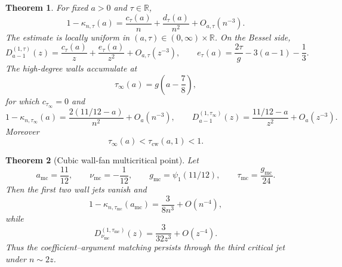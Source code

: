 \documentclass[11pt,a4paper]{amsart}
\numberwithin{equation}{section}
\theoremstyle{plain}
\newtheorem{theorem}{Theorem}[section]
\theoremstyle{definition}
\newcommand{\R}{\mathbb R}
\begin{document}
\begin{theorem}\label{thm:wall-fan}
For fixed \(a>0\) and \(\tau\in\R\),
\begin{equation}\label{eq:vertical-wall-two-term}
 1-\kappa_{n,\tau}(a)
 =\frac{c_\tau(a)}n+\frac{d_\tau(a)}{n^2}+O_{a,\tau}(n^{-3}).
\end{equation}
The estimate is locally uniform in \((a,\tau)\in(0,\infty)\times\R\).  On the
Bessel side,
\begin{equation}\label{eq:D-wall-two-term}
 D_{a-1}^{(1,\tau)}(z)
 =\frac{c_\tau(a)}z
 +\frac{e_\tau(a)}{z^2}
 +O_{a,\tau}(z^{-3}),
 \qquad
 e_\tau(a)=\frac{2\tau}{g}-3(a-1)-\frac13.
\end{equation}
The high-degree walls accumulate at
\begin{equation}\label{eq:tau-infty}
 \tau_\infty(a)=g\left(a-\frac78\right),
\end{equation}
for which \(c_{\tau_\infty}=0\) and
\begin{equation}\label{eq:second-order-match}
 1-\kappa_{n,\tau_\infty}(a)
 =\frac{2(11/12-a)}{n^2}+O_a(n^{-3}),
 \qquad
 D_{a-1}^{(1,\tau_\infty)}(z)
 =\frac{11/12-a}{z^2}+O_a(z^{-3}).
\end{equation}
Moreover
\begin{equation}\label{eq:wall-ordering}
 \tau_\infty(a)<\tau_{\mathrm{cw}}(a,1)<1.
\end{equation}
\end{theorem}

\begin{theorem}[Cubic wall-fan multicritical point]\label{thm:cubic-multicritical}
Let
\begin{equation}\label{eq:cubic-point}
 a_{\mathrm{mc}}=\frac{11}{12},
 \qquad
 \nu_{\mathrm{mc}}=-\frac1{12},
 \qquad
 g_{\mathrm{mc}}=\psi_1(11/12),
 \qquad
 \tau_{\mathrm{mc}}=\frac{g_{\mathrm{mc}}}{24}.
\end{equation}
Then the first two wall jets vanish and
\begin{equation}\label{eq:cubic-coeff-scaling}
 1-\kappa_{n,\tau_{\mathrm{mc}}}(a_{\mathrm{mc}})
 =\frac{3}{8n^3}+O(n^{-4}),
\end{equation}
while
\begin{equation}\label{eq:cubic-bessel-scaling}
 D_{\nu_{\mathrm{mc}}}^{(1,\tau_{\mathrm{mc}})}(z)
 =\frac{3}{32z^3}+O(z^{-4}).
\end{equation}
Thus the coefficient--argument matching persists through the third critical
jet under \(n\sim2z\).
\end{theorem}
\end{document}
